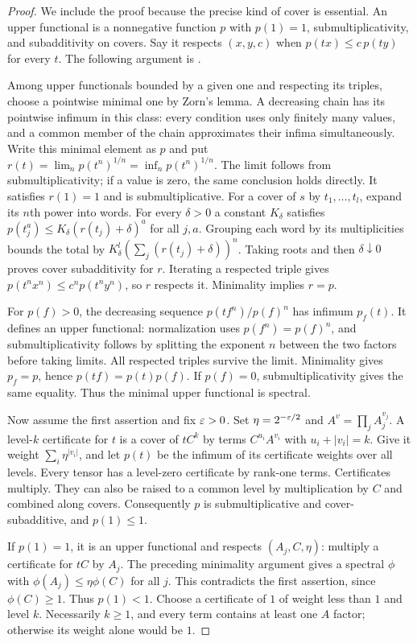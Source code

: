 \begin{proof}
We include the proof because the precise kind of cover is essential.
An upper functional is a nonnegative function $p$ with $p(1)=1$,
submultiplicativity, and subadditivity on covers.
Say it respects $(x,y,c)$ when $p(tx)\le c\,p(ty)$ for every $t$.
The following argument is \cite[Proposition A.5]{Anthropic2026}.

Among upper functionals bounded by a given one and respecting
its triples, choose a pointwise minimal one by Zorn's lemma.
A decreasing chain has its pointwise infimum in this class:
every condition uses only finitely many values, and a common
member of the chain approximates their infima simultaneously.
Write this minimal element as $p$ and put
$r(t)=\lim_n p(t^n)^{1/n}=\inf_n p(t^n)^{1/n}$.
The limit follows from submultiplicativity; if a value is zero,
the same conclusion holds directly.
It satisfies $r(1)=1$ and is submultiplicative.
For a cover of $s$ by $t_1,\ldots,t_l$, expand its $n$th power
into words. For every $\delta>0$ a constant $K_\delta$ satisfies
$p(t_j^a)\le K_\delta(r(t_j)+\delta)^a$ for all $j,a$.
Grouping each word by its multiplicities bounds the total by
$K_\delta^l(\sum_j(r(t_j)+\delta))^n$.
Taking roots and then $\delta\downarrow0$ proves cover
subadditivity for $r$. Iterating a respected triple gives
$p(t^n x^n)\le c^n p(t^n y^n)$, so $r$ respects it.
Minimality implies $r=p$.

For $p(f)>0$, the decreasing sequence
$p(tf^n)/p(f)^n$ has infimum $p_f(t)$.
It defines an upper functional: normalization uses
$p(f^n)=p(f)^n$, and submultiplicativity follows by splitting
the exponent $n$ between the two factors before taking limits.
All respected triples survive the limit. Minimality gives
$p_f=p$, hence $p(tf)=p(t)p(f)$.
If $p(f)=0$, submultiplicativity gives the same equality.
Thus the minimal upper functional is spectral.

Now assume the first assertion and fix $\varepsilon>0$. Set
$\eta=2^{-\varepsilon/2}$ and $A^v=\prod_j A_j^{v_j}$.
A level-$k$ certificate for $t$ is a cover of $tC^k$
by terms $C^{u_i}A^{v_i}$ with $u_i+|v_i|=k$.
Give it weight $\sum_i\eta^{|v_i|}$, and let $p(t)$ be
the infimum of its certificate weights over all levels.
Every tensor has a level-zero certificate by rank-one terms.
Certificates multiply. They can also be raised to a common
level by multiplication by $C$ and combined along covers.
Consequently $p$ is submultiplicative and cover-subadditive,
and $p(1)\le1$.

If $p(1)=1$, it is an upper functional and respects
$(A_j,C,\eta)$: multiply a certificate for $tC$ by $A_j$.
The preceding minimality argument gives a spectral $\phi$
with $\phi(A_j)\le\eta\phi(C)$ for all $j$.
This contradicts the first assertion, since $\phi(C)\ge1$.
Thus $p(1)<1$. Choose a certificate of $1$ of weight less
than $1$ and level $k$. Necessarily $k\ge1$, and every term
contains at least one $A$ factor; otherwise its weight alone
would be $1$.


\end{proof}
